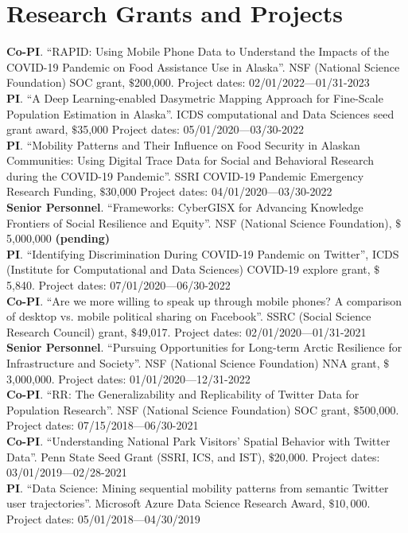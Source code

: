\documentclass[11pt, a4paper]{article}
\begin{document}
\section*{Research Grants and Projects}
\textbf{Co-PI}. ``RAPID: Using Mobile Phone Data to Understand the Impacts of the COVID-19 Pandemic on Food Assistance Use in Alaska''. NSF (National Science Foundation) SOC grant, $\$$200,000. Project dates: 02/01/2022—01/31-2023\\
\textbf{PI}. ``A Deep Learning-enabled Dasymetric Mapping Approach for Fine-Scale Population Estimation in Alaska''. ICDS computational and Data Sciences seed grant award, $\$$35,000 Project dates: 05/01/2020—03/30-2022\\
\textbf{PI}. ``Mobility Patterns and Their Influence on Food Security in Alaskan Communities: Using Digital Trace Data for Social and Behavioral Research during the COVID-19 Pandemic''. SSRI COVID-19 Pandemic Emergency Research Funding, $\$$30,000 Project dates: 04/01/2020—03/30-2022\\
\textbf{Senior Personnel}. ``Frameworks: CyberGISX for Advancing Knowledge Frontiers of Social Resilience and Equity''. NSF (National Science Foundation), $\$$5,000,000 \textbf{(pending)}\\
\textbf{PI}. ``Identifying Discrimination During COVID-19 Pandemic on Twitter'',  ICDS (Institute for Computational and Data Sciences) COVID-19 explore grant, $\$$5,840. Project dates: 07/01/2020—06/30-2022\\
\textbf{Co-PI}. ``Are we more willing to speak up through mobile phones?  A comparison of desktop vs. mobile political sharing on Facebook''. SSRC (Social Science Research Council) grant, $\$$49,017. Project dates: 02/01/2020—01/31-2021\\
\textbf{Senior Personnel}. ``Pursuing Opportunities for Long-term Arctic Resilience for Infrastructure and Society''. NSF (National Science Foundation) NNA grant, $\$$3,000,000. Project dates: 01/01/2020—12/31-2022\\
\textbf{Co-PI}. ``RR: The Generalizability and Replicability of Twitter Data for Population Research''. NSF (National Science Foundation) SOC grant, $\$$500,000. Project dates: 07/15/2018—06/30-2021\\
\textbf{Co-PI}. ``Understanding National Park Visitors’ Spatial Behavior with Twitter Data''. Penn State Seed Grant (SSRI, ICS, and IST), $\$$20,000. Project dates: 03/01/2019—02/28-2021\\
\textbf{PI}. ``Data Science: Mining sequential mobility patterns from semantic Twitter user trajectories''. Microsoft Azure Data Science Research Award, $\$10,000$. Project dates: 05/01/2018—04/30/2019\\
\end{document}
